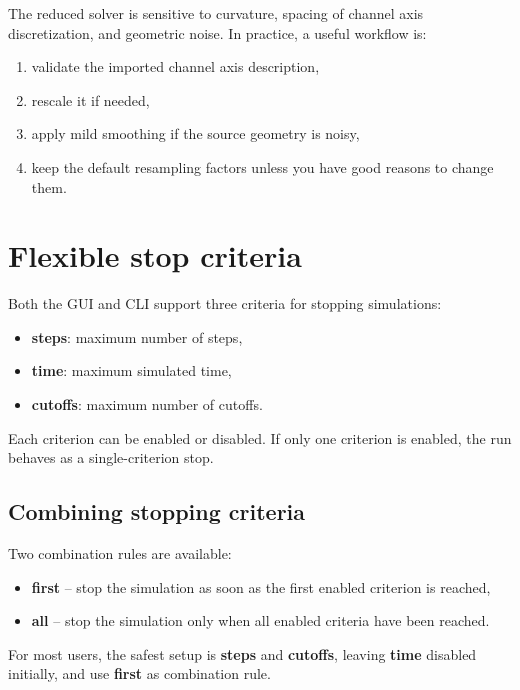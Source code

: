 \documentclass[11pt,a4paper]{article}
\begin{document}
The reduced solver is sensitive to curvature, spacing of channel axis discretization, and geometric noise. In practice, a useful workflow is:

\begin{enumerate}[leftmargin=1.4em]
	\item validate the imported channel axis description,
	\item rescale it if needed,
	\item apply mild smoothing if the source geometry is noisy,
	\item keep the default resampling factors unless you have good reasons to change them.
\end{enumerate}

\section{Flexible stop criteria}

Both the GUI and CLI support three criteria for stopping simulations:

\begin{itemize}[leftmargin=1.2em]
	\item \textbf{ steps}: maximum number of steps,
	\item \textbf{time}: maximum simulated time,
	\item \textbf{cutoffs}: maximum number of cutoffs.
\end{itemize}

Each criterion can be enabled or disabled. If only one criterion is enabled, the run behaves as a single-criterion stop.

\subsection{Combining stopping criteria}

Two combination rules are available:
\begin{itemize}[leftmargin=1.2em]
	\item \textbf{first} -- stop the simulation as soon as the first enabled criterion is reached,
	\item \textbf{all} -- stop the simulation only when all enabled criteria have been reached.
\end{itemize}

\begin{infobox}
	For most users, the safest setup is \textbf{steps} and \textbf{cutoffs}, leaving \textbf{time} disabled initially, and use \textbf{first} as combination rule.
\end{infobox}
\end{document}
